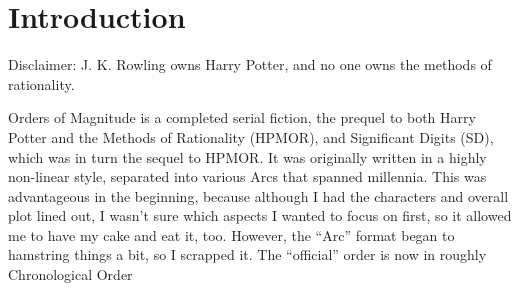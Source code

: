 \chapter{Introduction}
Disclaimer: J. K. Rowling owns Harry Potter, and no one owns the methods of
rationality.

Orders of Magnitude is a completed serial fiction, the prequel to both Harry Potter
and the Methods of Rationality (HPMOR), and Significant Digits (SD), which was in
turn the sequel to HPMOR. It was originally written in a highly non-linear style,
separated into various Arcs that spanned millennia. This was advantageous in the
beginning, because although I had the characters and overall plot lined out, I wasn’t
sure which aspects I wanted to focus on first, so it allowed me to have my cake and
eat it, too. However, the “Arc” format began to hamstring things a bit, so I scrapped
it. The “official” order is now in roughly Chronological Order